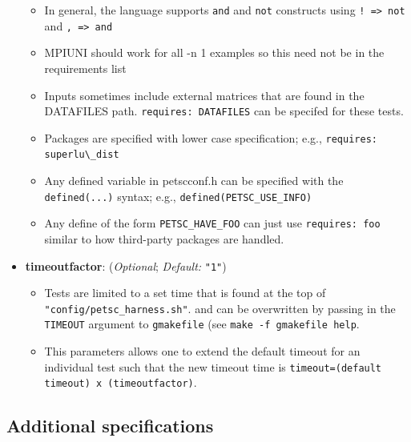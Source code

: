\begin{itemize}
\begin{itemize}
        \item In general, the language supports \lstinline{and} and \lstinline{not} constructs
        using \lstinline{! => not} and \lstinline{, => and}

        \item MPIUNI should work for all -n 1 examples so this need not be in the requirements list

        \item Inputs sometimes include external matrices that are found in the
        DATAFILES path.  \lstinline{requires: DATAFILES} can be specifed for these
        tests.

        \item Packages are specified with lower case specification; e.g.,
        \lstinline{requires: superlu\_dist}

        \item Any defined variable in petscconf.h can be specified with the
        \lstinline{defined(...)} syntax; e.g., \lstinline{defined(PETSC_USE_INFO)}

        \item Any define of the form \lstinline{PETSC_HAVE_FOO} can just use
        \lstinline{requires: foo} similar to how third-party packages are handled.

      \end{itemize}

    \item[]  \textbf{timeoutfactor}: (\emph{Optional}; \emph{Default:} \lstinline{"1"})
      \begin{itemize}

        \item Tests are limited to a set time that is found at the top of \lstinline{"config/petsc_harness.sh"}.
              and can be overwritten by passing in the \lstinline{TIMEOUT} argument to \lstinline{gmakefile} (see
              \lstinline{make -f gmakefile help}.  

        \item This parameters allows one to extend the default timeout for an individual test such that the new timeout time is \lstinline{timeout=(default timeout) x (timeoutfactor)}.

      \end{itemize}

\end{itemize}



\subsection{Additional specifications%
  \label{additional-specifications}%
}

